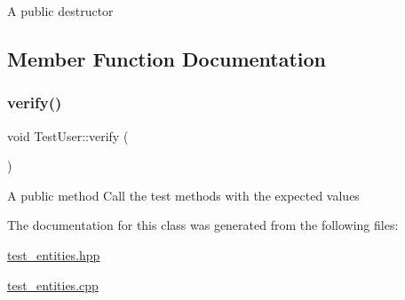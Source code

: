 A public destructor 

\subsection{Member Function Documentation}
\mbox{\label{class_test_user_a56b28bed0e29a52c29104693e6fa04bf}} 
\subsubsection{\texorpdfstring{verify()}{verify()}}
{\footnotesize\ttfamily void Test\+User\+::verify (\begin{DoxyParamCaption}{ }\end{DoxyParamCaption})}

A public method Call the test methods with the expected values 

The documentation for this class was generated from the following files\+:\begin{DoxyCompactItemize}
\item 
\hyperlink{test__entities_8hpp}{test\+\_\+entities.\+hpp}\item 
\hyperlink{test__entities_8cpp}{test\+\_\+entities.\+cpp}\end{DoxyCompactItemize}
